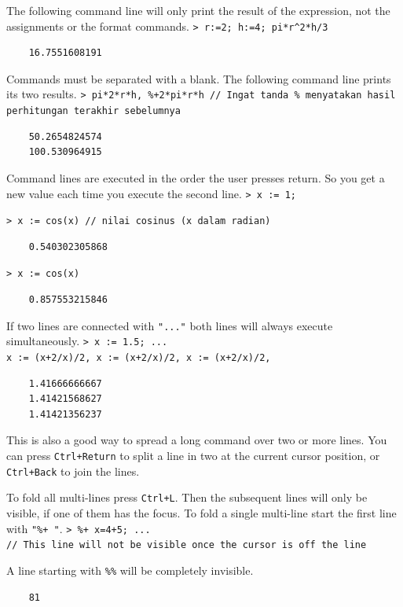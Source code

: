 \documentclass[11pt, a4paper]{article}
\newcommand{\emtcmd}[1]{\noindent\texttt{\textcolor{emtcommand}{>}\ #1}\par\smallskip}
\begin{document}
The following command line will only print the result of the expression, not the assignments or the format commands.
\emtcmd{r:=2; h:=4; pi*r\^{}2*h/3}
\begin{verbatim}
    16.7551608191
\end{verbatim}

Commands must be separated with a blank. The following command line prints its two results.
\emtcmd{pi*2*r*h, \%+2*pi*r*h \textcolor{emtcomment}{// Ingat tanda \% menyatakan hasil perhitungan terakhir sebelumnya}}
\begin{verbatim}
    50.2654824574
    100.530964915
\end{verbatim}

Command lines are executed in the order the user presses return. So you get a new value each time you execute the second line.
\emtcmd{x := 1;}
\emtcmd{x := cos(x) \textcolor{emtcomment}{// nilai cosinus (x dalam radian)}}
\begin{verbatim}
    0.540302305868
\end{verbatim}
\emtcmd{x := cos(x)}
\begin{verbatim}
    0.857553215846
\end{verbatim}

If two lines are connected with \texttt{"..."} both lines will always execute simultaneously.
\emtcmd{x := 1.5; ... \\
\hspace*{1em} x := (x+2/x)/2, x := (x+2/x)/2, x := (x+2/x)/2,}
\begin{verbatim}
    1.41666666667
    1.41421568627
    1.41421356237
\end{verbatim}

This is also a good way to spread a long command over two or more lines. You can press \texttt{Ctrl+Return} to split a line in two at the current cursor position, or \texttt{Ctrl+Back} to join the lines.

To fold all multi-lines press \texttt{Ctrl+L}. Then the subsequent lines will only be visible, if one of them has the focus. To fold a single multi-line start the first line with \texttt{"\%+ "}.
\emtcmd{\%+ x=4+5; ... \\
\hspace*{1em} \textcolor{emtcomment}{// This line will not be visible once the cursor is off the line}}

A line starting with \texttt{\%\%} will be completely invisible.
\begin{verbatim}
    81
\end{verbatim}
\end{document}
